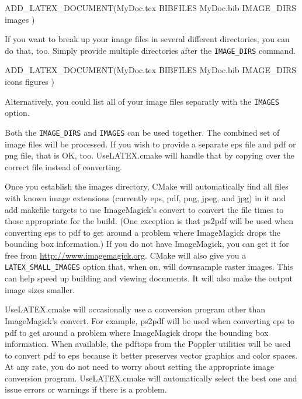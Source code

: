 \documentclass{article}
\newcommand*{\textfile}[1]{\textsf{#1}}
\newcommand*{\textprog}[1]{\textfile{#1}}
\newcommand*{\textcmake}[1]{\texttt{#1}}
\newcommand*{\textcmakevar}[1]{\textcmake{#1}}
\newcommand*{\UseLATEX}{\textfile{UseLATEX.cmake}\xspace}
\begin{document}
  \begin{CodeListing}
ADD_LATEX_DOCUMENT(MyDoc.tex
  BIBFILES MyDoc.bib
  IMAGE_DIRS images
  )
  \end{CodeListing}

  If you want to break up your image files in several different
  directories, you can do that, too. Simply provide multiple directories
  after the \textcmake{IMAGE\_DIRS} command.

  \begin{CodeListing}
ADD_LATEX_DOCUMENT(MyDoc.tex
  BIBFILES MyDoc.bib
  IMAGE_DIRS icons figures
  )
  \end{CodeListing}

  Alternatively, you could list all of your image files separatly with the
  \textcmake{IMAGES} option.


  Both the \textcmake{IMAGE\_DIRS} and \textcmake{IMAGES} can be used
  together. The combined set of image files will be processed. If you wish
  to provide a separate eps file and pdf or png file, that is OK,
  too. \UseLATEX will handle that by copying over the correct file instead
  of converting.

  Once you establish the images directory, CMake will automatically find
  all files with known image extensions (currently eps, pdf, png, jpeg, and
  jpg) in it and add makefile targets to use ImageMagick's
  \textprog{convert} to convert the file times to those appropriate for the
  build. (One exception is that \textprog{ps2pdf} will be used when
  converting eps to pdf to get around a problem where ImageMagick drops the
  bounding box information.)  If you do not have ImageMagick, you can get
  it for free from
  \href{http://www.imagemagick.org}{http://www.imagemagick.org}. CMake will
  also give you a \textcmakevar{LATEX\_SMALL\_IMAGES} option that, when on,
  will downsample raster images. This can help speed up building and
  viewing documents. It will also make the output image sizes smaller.

  \UseLATEX will occasionally use a conversion program other than
  ImageMagick's \textprog{convert}.  For example, \textprog{ps2pdf} will be
  used when converting eps to pdf to get around a problem where ImageMagick
  drops the bounding box information.  When available, the
  \textprog{pdftops} from the Poppler utilities will be used to convert pdf
  to eps because it better preserves vector graphics and color spaces.  At
  any rate, you do not need to worry about setting the appropriate image
  conversion program.  \UseLATEX will automatically select the best one and
  issue errors or warnings if there is a problem.
\end{document}
